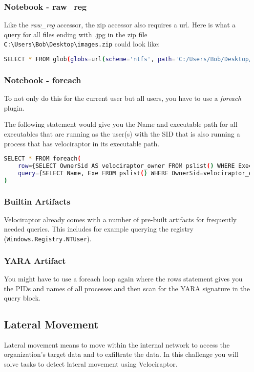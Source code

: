 \subsubsection{Notebook - raw\_reg}
Like the \textit{raw\_reg} accessor, the zip accessor also requires a url. Here is what a query for all files ending with .jpg in the zip file \lstinline|C:\Users\Bob\Desktop\images.zip| could look like:

\begin{lstlisting}[language=bash]
    SELECT * FROM glob(globs=url(scheme='ntfs', path='C:/Users/Bob/Desktop/images.zip', fragment='/**/*.jpg').String, accessor='zip')
\end{lstlisting}

\newpage

\subsubsection{Notebook - foreach}
To not only do this for the current user but all users, you have to use a \textit{foreach} plugin.

The following statement would give you the Name and executable path for all executables that are running as the user(s) with the SID that is also running a process that has velociraptor in its executable path.

\begin{lstlisting}[language=bash]
    SELECT * FROM foreach(
    row={SELECT OwnerSid AS velociraptor_owner FROM pslist() WHERE Exe=~'velociraptor'},
    query={SELECT Name, Exe FROM pslist() WHERE OwnerSid=velociraptor_owner}
)
\end{lstlisting}

\subsubsection{Builtin Artifacts}
Velociraptor already comes with a number of pre-built artifacts for frequently needed queries.
This includes for example querying the registry (\lstinline|Windows.Registry.NTUser|).

\subsubsection{YARA Artifact}
You might have to use a foreach loop again where the rows statement gives you the PIDs and names of all processes and then scan for the YARA signature in the query block.

\subsection{Lateral Movement}
Lateral movement means to move within the internal network to access the organization's target data and to exfiltrate the data. In this challenge you will solve tasks to detect lateral movement using Velociraptor.

